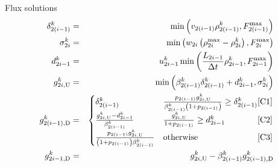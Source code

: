 \begin{frame}{Flux solutions}
\begin{eqnarray}
\demand_{2\left(\link-1\right)}^{\tind} & = & \min\left(\ffspeed_{2\left(i-1\right)}\densitydiscrete{2\left(\link-1\right)}{\tind},F_{2\left(\link-1\right)}^{\max}\right)\label{eq:first-ramp}\\
\supply_{2\link}^{\tind} & = & \min\left(\congspeed_{2i}\left(\density_{2i}^{\max}-\densitydiscrete{2\link}{\tind}\right),F_{2i}^{\max}\right)\label{eq:supply}\\
\rampDemand_{2\link-1}^{\tind} & = & \ramp_{2\link-1}^{\tind}\min\left(\frac{\length_{2\link-1}}{\Delta t}\densitydiscrete{2\link-1}{\tind},F_{2i-1}^{\max}\right)\label{eq:ramp-eqn}\\
\fin{2\link}{\tind} & = & \min\left(\splitratio_{2\left(\link-1\right)}^{\tind}\demand_{2\left(\link-1\right)}^{\tind}+\rampDemand_{2\link-1}^{\tind},\supply_{2\link}^{\tind}\right)\label{eq:fin}\\
\fout{2\left(\link-1\right)}{\tind} & = & \begin{cases}
\demand_{2\left(\link-1\right)}^{\tind} & \frac{p_{2(\link-1)}\fin{2\link}{\tind}}{\splitratio_{2\left(\link-1\right)}^{\tind}\left(1+p_{2(\link-1)}\right)}\ge\demand_{2\left(\link-1\right)}^{\tind}\hfill\text{[C1]}\\
\frac{\fin{2\link}{\tind}-\rampDemand_{2\link-1}^{\tind}}{\splitratio_{2\left(\link-1\right)}^{\tind}} & \frac{\fin{2\link}{\tind}}{1+p_{2(\link-1)}}\ge\rampDemand_{2\link-1}^{\tind}\hfill\text{[C2]}\\
\frac{p_{2(\link-1)}\fin{2\link}{\tind}}{\left(1+p_{2(\link-1)}\right)\splitratio_{2\left(\link-1\right)}^{\tind}} & \text{otherwise}\hfill\text{[C3]}
\end{cases}\label{eq:merge}\\
\fout{2\link-1}{\tind} & = & \fin{2\link}{\tind}-\splitratio_{2\left(\link-1\right)}^{\tind}\fout{2\left(\link-1\right)}{\tind}\label{eq:last-ramp}
\end{eqnarray}
\end{frame}

